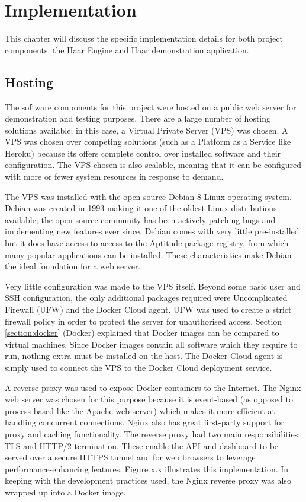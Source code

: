 \chapter{Implementation}
\label{chapter:implementation}
  This chapter will discuss the specific implementation details for both project components: the Haar Engine and Haar demonstration application.


  \section{Hosting}
    The software components for this project were hosted on a public web server for demonstration and testing purposes. There are a large number of hosting solutions available; in this case, a Virtual Private Server (VPS) was chosen. A VPS was chosen over competing solutions (such as a Platform as a Service like Heroku) because its offers complete control over installed software and their configuration. The VPS chosen is also scalable, meaning that it can be configured with more or fewer system resources in response to demand.

    The VPS was installed with the open source Debian 8 Linux operating system. Debian was created in 1993 making it one of the oldest Linux distributions available; the open source community has been actively patching bugs and implementing new features ever since. Debian comes with very little pre-installed but it does have access to access to the Aptitude package registry, from which many popular applications can be installed. These characteristics make Debian the ideal foundation for a web server.

    Very little configuration was made to the VPS itself. Beyond some basic user and SSH configuration, the only additional packages required were Uncomplicated Firewall (UFW) and the Docker Cloud agent. UFW was used to create a strict firewall policy in order to protect the server for unauthorised access. Section \ref{section:docker} (Docker) explained that Docker images can be compared to virtual machines. Since Docker images contain all software which they require to run, nothing extra must be installed on the host. The Docker Cloud agent is simply used to connect the VPS to the Docker Cloud deployment service.

    A reverse proxy was used to expose Docker containers to the Internet. The Nginx web server was chosen for this purpose because it is event-based (as opposed to process-based like the Apache web server) which makes it more efficient at handling concurrent connections. Nginx also has great first-party support for proxy and caching functionality. The reverse proxy had two main responsibilities: TLS and HTTP/2 termination. These enable the API and dashboard to be served over a secure HTTPS tunnel and for web browsers to leverage performance-enhancing features. Figure x.x illustrates this implementation. In keeping with the development practices used, the Nginx reverse proxy was also wrapped up into a Docker image.

